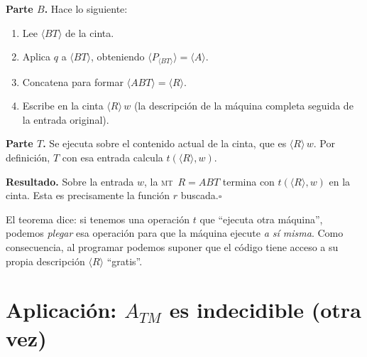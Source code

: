 \documentclass[11pt,a4paper]{article}
\theoremstyle{definicion}
\newcommand{\MT}{\textsc{mt}}
\newcommand{\enc}[1]{\langle #1 \rangle}
\begin{document}
\textbf{Parte $B$.} Hace lo siguiente:
\begin{enumerate}
    \item Lee $\enc{BT}$ de la cinta.
    \item Aplica $q$ a $\enc{BT}$, obteniendo $\enc{P_{\enc{BT}}} = \enc{A}$.
    \item Concatena para formar $\enc{ABT} = \enc{R}$.
    \item Escribe en la cinta $\enc{R}\, w$ (la descripción de la máquina completa seguida de la entrada original).
\end{enumerate}

\textbf{Parte $T$.} Se ejecuta sobre el contenido actual de la cinta, que es $\enc{R}\, w$. Por definición, $T$ con esa entrada calcula $t(\enc{R}, w)$.

\textbf{Resultado.} Sobre la entrada $w$, la \MT\ $R = ABT$ termina con $t(\enc{R}, w)$ en la cinta. Esta es precisamente la función $r$ buscada.\hfill$\square$

\begin{center}
\end{center}

\begin{intuicion}
El teorema dice: si tenemos una operación $t$ que ``ejecuta otra máquina'', podemos \emph{plegar} esa operación para que la máquina ejecute \emph{a sí misma}. Como consecuencia, al programar podemos suponer que el código tiene acceso a su propia descripción $\enc{R}$ ``gratis''.
\end{intuicion}

\section{Aplicación: $A_{TM}$ es indecidible (otra vez)}
\end{document}
